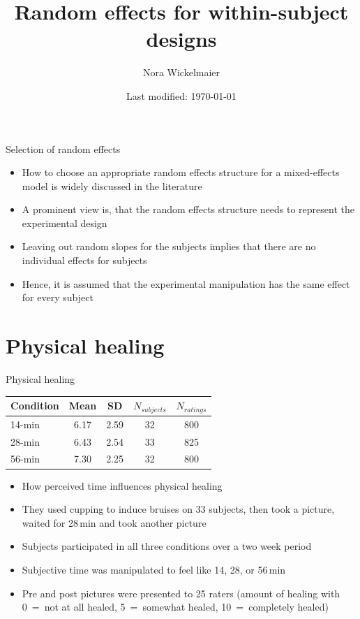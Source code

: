 \documentclass[aspectratio=169]{beamer}
\title{Random effects for within-subject designs}
\author{Nora Wickelmaier}
\date{Last modified: \today}
\begin{document}
\begin{frame}{}
\thispagestyle{empty}
\titlepage
\end{frame}


\begin{frame}[<+->]{Selection of random effects}
  \begin{itemize}
    \item How to choose an appropriate random effects structure for a
      mixed-effects model is widely discussed in the literature
      \citep[e.\,g.,][]{Barr2013, Gelman2024, Bates2018}
    \item A prominent view is, that the random effects structure needs to
      represent the experimental design
    \item Leaving out random slopes for the subjects implies that there are no
      individual effects for subjects
    \item Hence, it is assumed that the experimental manipulation has the same
      effect for every subject
  \end{itemize}
\end{frame}

\section{Physical healing}

\begin{frame}[<+->]{Physical healing}{\citep{Aungle2023}}
  \begin{center}
  \begin{tabular}{l|cccc}
    \hline
    Condition & Mean  & SD    & $N_{subjects}$ & $N_{ratings}$ \\
    \hline
    14-min    & 6.17  & 2.59  & 32             &  800 \\
    28-min    & 6.43  & 2.54  & 33             &  825 \\
    56-min    & 7.30  & 2.25  & 32             &  800 \\
    \hline
  \end{tabular}
  \end{center}
  \begin{itemize}
    \item How perceived time influences physical healing
    \item They used cupping to induce bruises on 33 subjects, then took a
      picture, waited for 28\,min and took another picture
    \item Subjects participated in all three conditions over a two week period
    \item Subjective time was manipulated to feel like 14, 28, or 56\,min
    \item Pre and post pictures were presented to 25 raters (amount of healing
      with 0~=~not at all healed, 5~=~somewhat healed, 10~=~completely healed)
  \end{itemize}
\end{frame}
\end{document}
